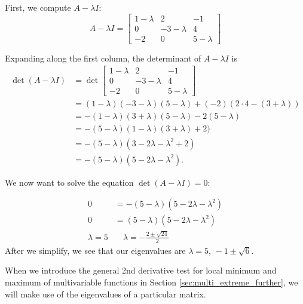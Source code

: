 {First, we compute $A - \lambda I$:
\[A -\lambda I= 
\begin{bmatrix}
	1-\lambda &2& -1 \\
	0 & -3 -\lambda & 4\\
	-2 & 0 & 5-\lambda 	
\end{bmatrix}
\]

Expanding along the first column, the determinant of $A-\lambda I$ is 
\begin{align*}
\det (A-\lambda I) &= \det 
\begin{bmatrix}
	1-\lambda &2& -1 \\
	0 & -3 -\lambda & 4\\
	-2 & 0 & 5-\lambda 	
\end{bmatrix}\\
& = (1-\lambda)(-3-\lambda)(5-\lambda)+(-2)(2\cdot 4 -(3+\lambda))\\
	&= -(1-\lambda)(3+\lambda)(5-\lambda) - 2(5-\lambda) \\
	&= -(5-\lambda)(1-\lambda)(3+\lambda)+2)\\
	&= -(5-\lambda)(3-2\lambda -\lambda^2+2)\\
	&= -(5-\lambda)(5-2\lambda - \lambda^2).
\end{align*}

We now want to solve the equation $\det(A-\lambda I) = 0$:

\begin{align*}
	0 &=-(5-\lambda)(5-2\lambda - \lambda^2)\\
	0 &=(5-\lambda)(5-2\lambda -\lambda^2)\\
	\lambda = 5 &\quad \lambda = -\frac{2\pm\sqrt{24}}{2}
\end{align*}
After we simplify, we see that our eigenvalues are $\lambda = 5,\, -1\pm \sqrt{6}$.
}

\bigskip

When we introduce the general 2nd derivative test for local minimum and maximum of multivariable functions in Section \ref{sec:multi_extreme_further}, we will make use of the eigenvalues of a particular matrix.













